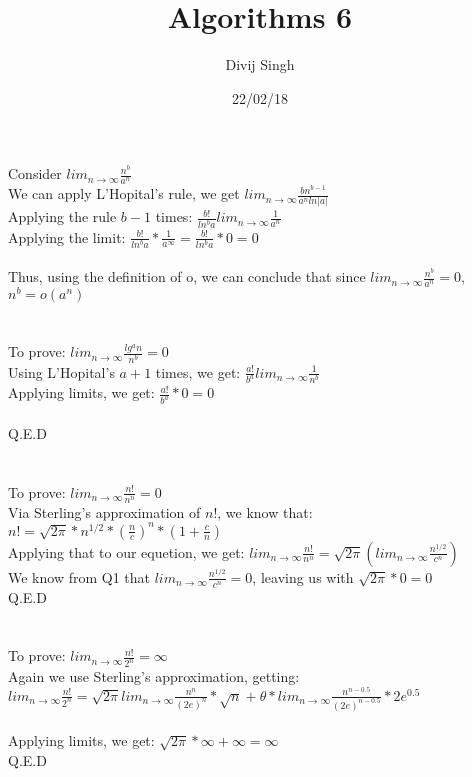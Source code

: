\documentclass{article}
\title{Algorithms 6}
\author{Divij Singh}
\date{22/02/18}
\begin{document}
	\maketitle
	
	\section{}
	Consider $lim_{n \rightarrow \infty} \frac{n^b}{a^n}$\\
	We can apply L'Hopital's rule, we get $lim_{n \rightarrow \infty} \frac{bn^{b-1}}{a^nln|a|}$\\
	Applying the rule $b-1$ times: $\frac{b!}{ln^b a} lim_{n \rightarrow \infty}\frac{1}{a^n}$\\
	Applying the limit: $\frac{b!}{ln^ba} * \frac{1}{a^{\infty}} = \frac{b!}{ln^ba} * 0=0$\\
	\\
	Thus, using the definition of o, we can conclude that since $lim_{n \rightarrow \infty} \frac{n^b}{a^n} =0$, $n^b = o(a^n)$
	
	\section{}
	To prove: $lim_{n \rightarrow \infty} \frac{lg^an}{n^b} = 0$\\
	Using L'Hopital's $a+1$ times, we get: $\frac{a!}{b^a} lim_{n \rightarrow \infty} \frac{1}{n^b}$\\
	Applying limits, we get: $ \frac{a!}{b^a} * 0 = 0$\\
	\\
	Q.E.D
	
	\section{}
	To prove: $lim_{n \rightarrow \infty} \frac{n!}{n^n} = 0$\\
	Via Sterling's approximation of $n!$, we know that: $n! = \sqrt{2 \pi} * n^{1/2} * (\frac{n}{c})^n * (1+ \frac{c}{n})$\\
	Applying that to our equetion, we get: $lim_{n \rightarrow \infty} \frac{n!}{n^n} = \sqrt{2 \pi} (lim_{n \rightarrow \infty} \frac{n^{1/2}}{c^n})$\\
	We know from Q1 that $lim_{n \rightarrow \infty} \frac{n^{1/2}}{c^n} =0$, leaving us with $ \sqrt{2 \pi}*0 = 0$\\
	Q.E.D
	
	\section{}
	To prove: $lim_{n \rightarrow \infty} \frac{n!}{2^n} = \infty$\\
	Again we use Sterling's approximation, getting:\\
	 $lim_{n \rightarrow \infty} \frac{n!}{2^n} = \sqrt{2 \pi} lim_{n \rightarrow \infty} \frac{n^n}{(2e)^n} * \sqrt{n}+ \theta*lim_{n \rightarrow \infty} \frac{n^{n-0.5}}{(2e)^{n-0.5}} * 2e^{0.5}$\\
	\\
	Applying limits, we get: $\sqrt{2 \pi} * \infty + \infty = \infty$\\
	Q.E.D
	
\end{document}
